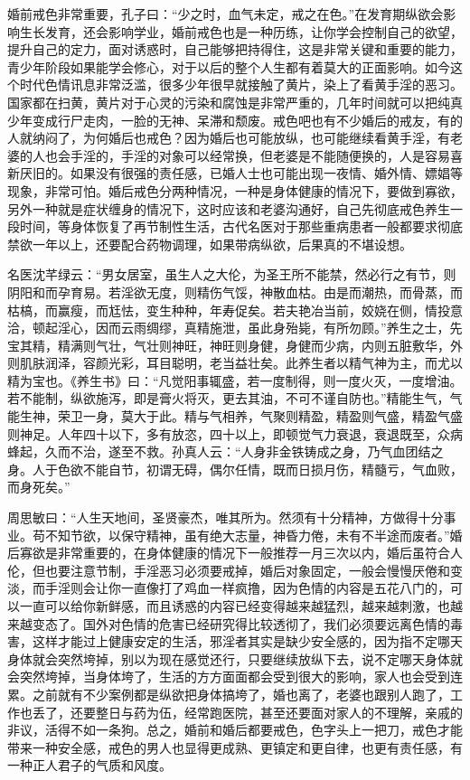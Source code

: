 婚前戒色非常重要，孔子曰：“少之时，血气未定，戒之在色。”在发育期纵欲会影响生长发育，还会影响学业，婚前戒色也是一种历练，让你学会控制自己的欲望，提升自己的定力，面对诱惑时，自己能够把持得住，这是非常关键和重要的能力，青少年阶段如果能学会修心，对于以后的整个人生都有着莫大的正面影响。如今这个时代色情讯息非常泛滥，很多少年很早就接触了黄片，染上了看黄手淫的恶习。国家都在扫黄，黄片对于心灵的污染和腐蚀是非常严重的，几年时间就可以把纯真少年变成行尸走肉，一脸的无神、呆滞和颓废。戒色吧也有不少婚后的戒友，有的人就纳闷了，为何婚后也戒色？因为婚后也可能放纵，也可能继续看黄手淫，有老婆的人也会手淫的，手淫的对象可以经常换，但老婆是不能随便换的，人是容易喜新厌旧的。如果没有很强的责任感，已婚人士也可能出现一夜情、婚外情、嫖娼等现象，非常可怕。婚后戒色分两种情况，一种是身体健康的情况下，要做到寡欲，另外一种就是症状缠身的情况下，这时应该和老婆沟通好，自己先彻底戒色养生一段时间，等身体恢复了再节制性生活，古代名医对于那些重病患者一般都要求彻底禁欲一年以上，还要配合药物调理，如果带病纵欲，后果真的不堪设想。

名医沈芊绿云：“男女居室，虽生人之大伦，为圣王所不能禁，然必行之有节，则阴阳和而孕育易。若淫欲无度，则精伤气馁，神散血枯。由是而潮热，而骨蒸，而枯槁，而赢瘦，而尪怯，变生种种，年寿促矣。若夫艳冶当前，姣娆在侧，情投意洽，顿起淫心，因而云雨绸缪，真精施泄，虽此身殆毙，有所勿顾。”养生之士，先宝其精，精满则气壮，气壮则神旺，神旺则身健，身健而少病，内则五脏敷华，外则肌肤润泽，容颜光彩，耳目聪明，老当益壮矣。此养生者以精气神为主，而尤以精为宝也。《养生书》曰：“凡觉阳事辄盛，若一度制得，则一度火灭，一度增油。若不能制，纵欲施泻，即是膏火将灭，更去其油，不可不谨自防也。”精能生气，气能生神，荣卫一身，莫大于此。精与气相养，气聚则精盈，精盈则气盛，精盈气盛则神足。人年四十以下，多有放恣，四十以上，即顿觉气力衰退，衰退既至，众病蜂起，久而不治，遂至不救。孙真人云：“人身非金铁铸成之身，乃气血团结之身。人于色欲不能自节，初谓无碍，偶尔任情，既而日损月伤，精髓亏，气血败，而身死矣。”

周思敏曰：“人生天地间，圣贤豪杰，唯其所为。然须有十分精神，方做得十分事业。苟不知节欲，以保守精神，虽有绝大志量，神昏力倦，未有不半途而废者。”婚后寡欲是非常重要的，在身体健康的情况下一般推荐一月三次以内，婚后虽符合人伦，但也要注意节制，手淫恶习必须要戒掉，婚后对象固定，一般会慢慢厌倦和变淡，而手淫则会让你一直像打了鸡血一样疯撸，因为色情的内容是五花八门的，可以一直可以给你新鲜感，而且诱惑的内容已经变得越来越猛烈，越来越刺激，也越来越变态了。国外对色情的危害已经研究得比较透彻了，我们必须要远离色情的毒害，这样才能过上健康安定的生活，邪淫者其实是缺少安全感的，因为指不定哪天身体就会突然垮掉，别以为现在感觉还行，只要继续放纵下去，说不定哪天身体就会突然垮掉，当身体垮了，生活的方方面面都会受到很大的影响，家人也会受到连累。之前就有不少案例都是纵欲把身体搞垮了，婚也离了，老婆也跟别人跑了，工作也丢了，还要整日与药为伍，经常跑医院，甚至还要面对家人的不理解，亲戚的非议，活得不如一条狗。总之，婚前和婚后都要戒色，色字头上一把刀，戒色才能带来一种安全感，戒色的男人也显得更成熟、更镇定和更自律，也更有责任感，有一种正人君子的气质和风度。

